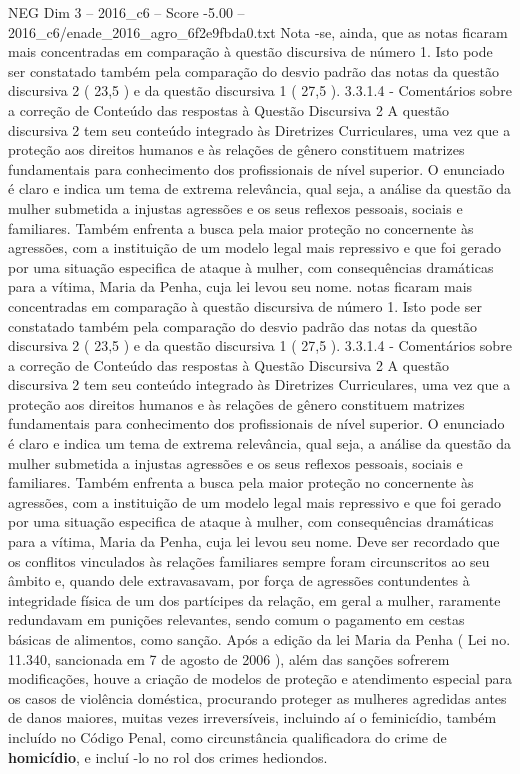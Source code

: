 \begin{textsample}{NEG Dim 3 – 2016\_c6 – Score -5.00 – 2016\_c6/enade\_2016\_agro\_6f2e9fbda0.txt}
Nota -se, ainda, que as notas ficaram mais concentradas em comparação à questão discursiva de número 1.
Isto pode ser constatado também pela comparação do desvio padrão das notas da questão discursiva 2 ( 23,5 ) e da questão discursiva 1 ( 27,5 ). 3.3.1.4 - Comentários sobre a correção de Conteúdo das respostas à Questão Discursiva 2 A questão discursiva 2 tem seu conteúdo integrado às Diretrizes Curriculares, uma vez que a proteção aos direitos humanos e às relações de gênero constituem matrizes fundamentais para conhecimento dos profissionais de nível superior.
O enunciado é claro e indica um tema de extrema relevância, qual seja, a análise da questão da mulher submetida a injustas agressões e os seus reflexos pessoais, sociais e familiares.
Também enfrenta a busca pela maior proteção no concernente às agressões, com a instituição de um modelo legal mais repressivo e que foi gerado por uma situação especifica de ataque à mulher, com consequências dramáticas para a vítima, Maria da Penha, cuja lei levou seu nome. notas ficaram mais concentradas em comparação à questão discursiva de número 1.
Isto pode ser constatado também pela comparação do desvio padrão das notas da questão discursiva 2 ( 23,5 ) e da questão discursiva 1 ( 27,5 ). 3.3.1.4 - Comentários sobre a correção de Conteúdo das respostas à Questão Discursiva 2 A questão discursiva 2 tem seu conteúdo integrado às Diretrizes Curriculares, uma vez que a proteção aos direitos humanos e às relações de gênero constituem matrizes fundamentais para conhecimento dos profissionais de nível superior.
O enunciado é claro e indica um tema de extrema relevância, qual seja, a análise da questão da mulher submetida a injustas agressões e os seus reflexos pessoais, sociais e familiares.
Também enfrenta a busca pela maior proteção no concernente às agressões, com a instituição de um modelo legal mais repressivo e que foi gerado por uma situação especifica de ataque à mulher, com consequências dramáticas para a vítima, Maria da Penha, cuja lei levou seu nome.
Deve ser recordado que os conflitos vinculados às relações familiares sempre foram circunscritos ao seu âmbito e, quando dele extravasavam, por força de agressões contundentes à integridade física de um dos partícipes da relação, em geral a mulher, raramente redundavam em punições relevantes, sendo comum o pagamento em cestas básicas de alimentos, como sanção.
Após a edição da lei Maria da Penha ( Lei no. 11.340, sancionada em 7 de agosto de 2006 ), além das sanções sofrerem modificações, houve a criação de modelos de proteção e atendimento especial para os casos de violência doméstica, procurando proteger as mulheres agredidas antes de danos maiores, muitas vezes irreversíveis, incluindo aí o feminicídio, também incluído no Código Penal, como circunstância qualificadora do crime de \textbf{homicídio}, e incluí -lo no rol dos crimes hediondos.

\end{textsample}
